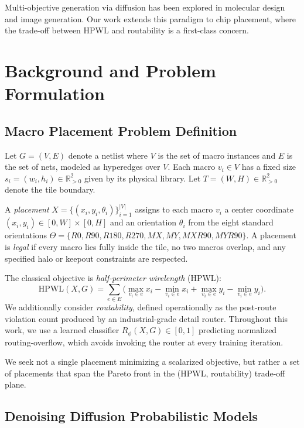 \documentclass{ieeeaccess}
\begin{document}
Multi-objective generation via diffusion has been explored in molecular design and image generation. Our work extends this paradigm to chip placement, where the trade-off between HPWL and routability is a first-class concern.

\section{Background and Problem Formulation}
\label{sec:background}

\subsection{Macro Placement Problem Definition}

Let $G = (V, E)$ denote a netlist where $V$ is the set of macro instances and $E$ is the set of nets, modeled as hyperedges over $V$. Each macro $v_i \in V$ has a fixed size $s_i = (w_i, h_i) \in \mathbb{R}^2_{>0}$ given by its physical library. Let $T = (W, H) \in \mathbb{R}^2_{>0}$ denote the tile boundary.

A \emph{placement} $X = \{(x_i, y_i, \theta_i)\}_{i=1}^{|V|}$ assigns to each macro $v_i$ a center coordinate $(x_i, y_i) \in [0, W] \times [0, H]$ and an orientation $\theta_i$ from the eight standard orientations $\Theta = \{R0, R90, R180, R270, MX, MY, MXR90, MYR90\}$. A placement is \emph{legal} if every macro lies fully inside the tile, no two macros overlap, and any specified halo or keepout constraints are respected.

The classical objective is \emph{half-perimeter wirelength} (HPWL):
\begin{equation}
\textrm{HPWL}(X, G) = \sum_{e \in E}\!\Bigg(\!\!\!\max_{v_i \in e}\!x_i - \!\!\!\min_{v_i \in e}\!x_i + \!\!\max_{v_i \in e}\!y_i - \!\!\!\min_{v_i \in e}\!y_i\!\Bigg)\!\!.
\label{eq:hpwl}
\end{equation}
We additionally consider \emph{routability}, defined operationally as the post-route violation count produced by an industrial-grade detail router. Throughout this work, we use a learned classifier $R_\phi(X, G) \in [0, 1]$ predicting normalized routing-overflow, which avoids invoking the router at every training iteration.

We seek not a single placement minimizing a scalarized objective, but rather a set of placements that span the Pareto front in the (HPWL, routability) trade-off plane.

\subsection{Denoising Diffusion Probabilistic Models}
\end{document}
